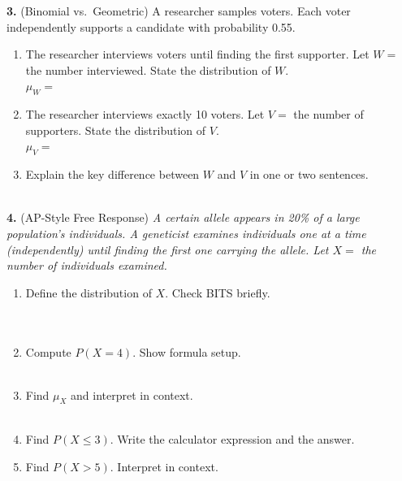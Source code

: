 \documentclass[10pt]{article}
\begin{document}
\begin{practicebox}
\vspace{8pt}
\textbf{3.} (Binomial vs.\ Geometric) A researcher samples voters.
Each voter independently supports a candidate with probability 0.55.
\begin{enumerate}[label=(\alph*), leftmargin=2em, itemsep=8pt]
  \item The researcher interviews voters until finding the first supporter.
        Let $W =$ the number interviewed. State the distribution of $W$.\\
        \blank{5cm} \quad $\mu_W = $ \blank{3cm}
  \item The researcher interviews exactly 10 voters.
        Let $V =$ the number of supporters. State the distribution of $V$.\\
        \blank{5cm} \quad $\mu_V = $ \blank{3cm}
  \item Explain the key difference between $W$ and $V$ in one or two sentences.\\
        \writeline\\[1pt]\writeline
\end{enumerate}

\vspace{8pt}
\textbf{4.} (AP-Style Free Response) \textit{A certain allele appears in 20\% of
a large population's individuals. A geneticist examines individuals one at a time
(independently) until finding the first one carrying the allele.
Let $X =$ the number of individuals examined.}
\begin{enumerate}[label=(\alph*), leftmargin=2em, itemsep=8pt]
  \item Define the distribution of $X$. Check BITS briefly.\\
        \writeline\\[1pt]\writeline\\[1pt]\writeline
  \item Compute $P(X = 4)$. Show formula setup.\\
        \writeline\\[1pt]\writeline
  \item Find $\mu_X$ and interpret in context.\\
        \writeline\\[1pt]\writeline
  \item Find $P(X \le 3)$. Write the calculator expression and the answer.\\
        \writeline
  \item Find $P(X > 5)$. Interpret in context.\\
        \writeline\\[1pt]\writeline
\end{enumerate}


\end{practicebox}
\end{document}
